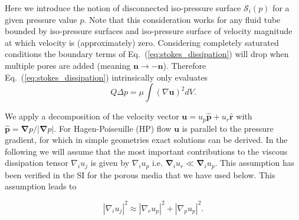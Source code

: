 \documentclass[draft]{agujournal2019}
\begin{document}
Here we introduce the notion of disconnected iso-pressure surface $\mathcal{S}_i(p)$ for a given pressure value $p$. Note that this consideration works for any fluid tube bounded by iso-pressure surfaces and iso-pressure surface of velocity magnitude at which velocity is (approximately) zero. Considering completely saturated conditions the boundary terms of Eq.~(\ref{eq:stokes_dissipation}) will drop when multiple pores are added (meaning $\mathbf{n}\rightarrow -\mathbf{n}$). Therefore Eq.~(\ref{eq:stokes_dissipation}) intrinsically only evaluates
\begin{equation}
Q \Delta p=\mu\int (\nabla \mathbf{u})^2 dV.\label{eq:pore_based_energy_dissipation}
\end{equation}

We apply a decomposition of the velocity vector  $\mathbf{u} = u_p \mathbf{\hat{p}} + u_r \mathbf{\hat{r}}$ with $\mathbf{\hat{p}} =\mathbf{ \nabla}p/|\mathbf{ \nabla}p|$. For Hagen-Poiseuille (HP) flow $\mathbf{u}$ is parallel to the pressure gradient, for which in simple geometries exact solutions can be derived. In the following we will assume that the most important contributions to the viscous dissipation tensor $\nabla_i u_j$ is given by $\nabla_i u_p$ i.e. $\mathbf{\nabla}_i u_r \ll \mathbf{\nabla}_i u_p $. This assumption has been verified in the SI for the porous media that we have used below. This assumption leads to 

\begin{equation}
\left|\nabla_i u_j\right|^2 \approx  \left|\nabla_r u_p\right|^2 + \left|\nabla_p u_p\right|^2 .\label{eq:reduced_dissipation_tensor}
\end{equation}
\end{document}

